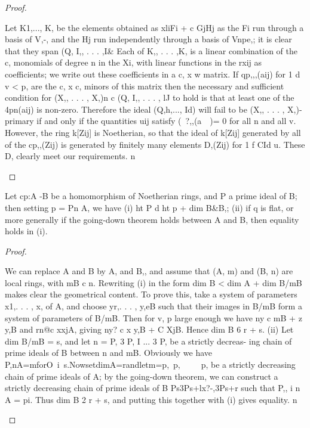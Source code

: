 \begin{proof}
\begin{mathematicalrecord}
Let K1,..., K, be the elements obtained as xliFi + c GjHj as the Fi run
through a basis of V,-, and the Hj run independently through a basis
of Vnpe,; it is clear that they span (Q, I,, . . . ,I& Each of K,, . . . ,K, is a
linear combination of the c, monomials of degree n in the Xi, with linear
functions in the rxij as coefficients; we write out these coefficients in a
c, x w matrix. If qp,,,(aij) for 1 d v < p, are the c, x c, minors of this matrix
then the necessary and sufficient condition for (X,, . . . , X,)n c (Q, I,, . . . , lJ to
hold is that at least one of the 4pn(aij) is non-zero. Therefore the ideal
(Q,h,..., Id) will fail to be (X,, . . . , X,)-primary if and only if the
quantities uij satisfy (~?,,(a~~)= 0 for all n and all v. However, the ring k[Zij]
is Noetherian, so that the ideal of k[Zij] generated by all of the cp,,(Zij) is
generated by finitely many elements D,(Zij) for 1 f CId u. These D, clearly
meet our requirements.         n
\end{mathematicalrecord}
\end{proof}


\begin{theorem}[Theorem 15.1]\label{mcrt-auto-theorem-15-1}\uses{}
\begin{mathematicalrecord}
Let cp:A -B             be a homomorphism     of Noetherian rings,
 and P a prime ideal of B; then setting p = Pn A, we have
   (i) ht P d ht p + dim B&B,;
   (ii) if q is flat, or more generally if the going-down theorem holds between
A and B, then equality holds in (i).
\end{mathematicalrecord}
\end{theorem}
\begin{proof}
\begin{mathematicalrecord}
We can replace A and B by A, and B,, and assume that (A, m) and
(B, n) are local rings, with mB c n. Rewriting (i) in the form
            dim B < dim A + dim B/mB
makes clear the geometrical content. To prove this, take a system of
parameters x1,. . . , x, of A, and choose yr,. . . , y,eB such that their images
in B/mB form a system of parameters of B/mB. Then for v, p large enough
 we have ny c mB + z y,B and rn@c xxjA, giving ny? c x y,B + C XjB.
Hence dim B 6 r + s.
   (ii) Let dim B/mB = s, and let n = P, 3 P, I ... 3 P, be a strictly decreas-
ing chain of prime ideals of B between n and mB. Obviously we have
P,nA=mforO~i~s.NowsetdimA=randletm=p,~p,~~~~~p,
be a strictly decreasing chain of prime ideals of A; by the going-down
theorem, we can construct a strictly decreasing chain of prime ideals of B
            Ps3Ps+lx?-,3Ps+r            such that P,, i n A = pi.
Thus dim B 2 r + s, and putting this together with (i) gives equality.         n
\end{mathematicalrecord}
\end{proof}


